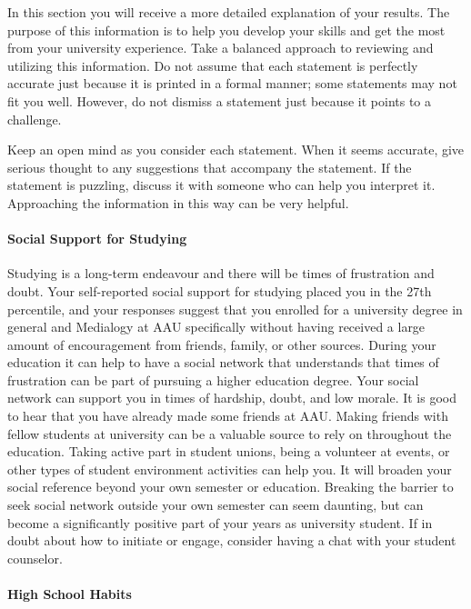 \documentclass[]{article}
\let\oldparagraph\paragraph
\renewcommand{\paragraph}[1]{\oldparagraph{#1}\mbox{}}
\begin{document}
In this section you will receive a more detailed explanation of your
results. The purpose of this information is to help you develop your
skills and get the most from your university experience. Take a balanced
approach to reviewing and utilizing this information. Do not assume that
each statement is perfectly accurate just because it is printed in a
formal manner; some statements may not fit you well. However, do not
dismiss a statement just because it points to a challenge.

Keep an open mind as you consider each statement. When it seems
accurate, give serious thought to any suggestions that accompany the
statement. If the statement is puzzling, discuss it with someone who can
help you interpret it. Approaching the information in this way can be
very helpful.

\paragraph{Social Support for
Studying}\label{social-support-for-studying}

Studying is a long-term endeavour and there will be times of frustration
and doubt. Your self-reported social support for studying placed you in
the 27th percentile, and your responses suggest that you enrolled for a
university degree in general and Medialogy at AAU specifically without
having received a large amount of encouragement from friends, family, or
other sources. During your education it can help to have a social
network that understands that times of frustration can be part of
pursuing a higher education degree. Your social network can support you
in times of hardship, doubt, and low morale. It is good to hear that you
have already made some friends at AAU. Making friends with fellow
students at university can be a valuable source to rely on throughout
the education. Taking active part in student unions, being a volunteer
at events, or other types of student environment activities can help
you. It will broaden your social reference beyond your own semester or
education. Breaking the barrier to seek social network outside your own
semester can seem daunting, but can become a significantly positive part
of your years as university student. If in doubt about how to initiate
or engage, consider having a chat with your student counselor.

\paragraph{High School Habits}\label{high-school-habits}
\end{document}
